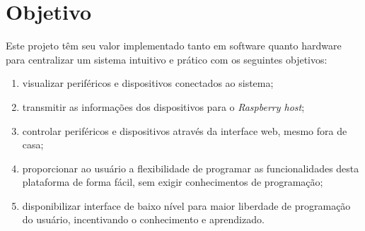 \documentclass[../../layout.tex]{subfiles}
\begin{document}
\section{Objetivo}
\hspace*{3em}Este projeto têm seu valor implementado tanto em software quanto hardware para centralizar um sistema intuitivo e prático com os seguintes objetivos:
\begin{enumerate}[label=\alph*)]
\itemsep0em
\item visualizar periféricos e dispositivos conectados ao sistema;
\item transmitir as informações dos dispositivos para o \emph{Raspberry host};
\item controlar periféricos e dispositivos através da interface web, mesmo fora de casa;
\item proporcionar ao usuário a flexibilidade de programar as funcionalidades desta plataforma de forma fácil, sem exigir conhecimentos de programação;
\item disponibilizar interface de baixo nível para maior liberdade de programação do usuário, incentivando o conhecimento e aprendizado.
\end{enumerate}
\end{document}
